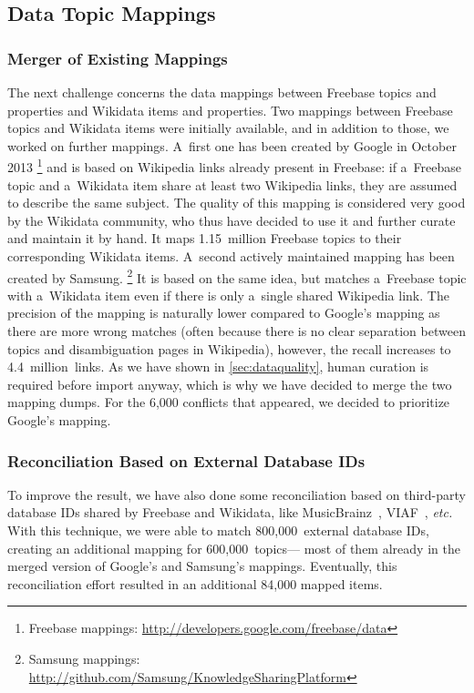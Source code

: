 \documentclass{acm_proc_article-sp}
\begin{document}
\subsection{Data Topic Mappings}\label{subsec:topic-mappings}

\subsubsection{Merger of Existing Mappings}

The next challenge concerns the data mappings between Freebase topics and properties
and Wikidata items and properties.
Two mappings between Freebase topics and Wikidata items were initially available,
and in addition to those, we worked on further mappings.
A~first one has been created by Google in October 2013%
\footnote{Freebase mappings: \url{http://developers.google.com/freebase/data}}
and is based on Wikipedia links already present in Freebase: if a~Freebase topic and
a~Wikidata item share at least two Wikipedia links, they are assumed to describe the same subject.
The quality of this mapping is considered very good by the Wikidata community,
who thus have decided to use it and further curate and maintain it by hand.
It maps 1.15~million Freebase topics to their corresponding Wikidata items.
A~second actively maintained mapping has been created by Samsung.%
\footnote{Samsung mappings: \url{http://github.com/Samsung/KnowledgeSharingPlatform}}
It is based on the same idea, but matches a~Freebase topic with a~Wikidata item
even if there is only a~single shared Wikipedia link.
The precision of the mapping is naturally lower compared to Google's mapping
as there are more wrong matches (often because there is no clear separation between topics
and disambiguation pages in Wikipedia), however, the recall increases to 4.4~million~links.
As we have shown in \autoref{sec:dataquality},
human curation is required before import anyway,
which is why we have decided to merge the two mapping dumps.
For the 6,000 conflicts that appeared, we decided to prioritize Google's mapping.

\subsubsection{Reconciliation Based on External Database IDs}

To improve the result, we have also done some reconciliation based on third-party database IDs
shared by Freebase and Wikidata, like MusicBrainz~\cite{musicbrainz},
VIAF~\cite{viaf}, \emph{etc.}
With this technique, we were able to match 800,000~external database IDs,
creating an additional mapping for 600,000~topics---%
most of them already in the merged version of Google's and Samsung's mappings.
Eventually, this reconciliation effort resulted in an additional 84,000 mapped items.
\end{document}
